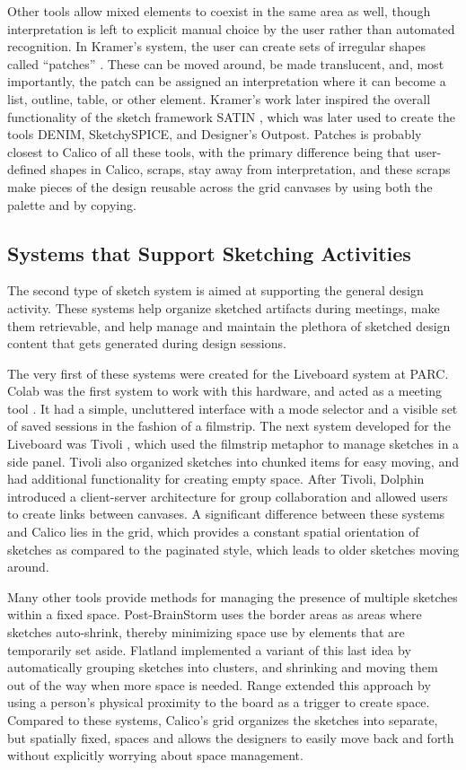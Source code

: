 Other tools allow mixed elements to coexist in the same area as well, though interpretation is left to explicit manual choice by the user rather than automated recognition. In Kramer's system, the user can create sets of irregular shapes called ``patches'' \citep{Kramer}. These can be moved around, be made translucent, and, most importantly, the patch can be assigned an interpretation where it can become a list, outline, table, or other element. Kramer's work later inspired the overall functionality of the sketch framework SATIN \citep{Hong}, which was later used to create the tools DENIM, SketchySPICE, and Designer's Outpost.  Patches is probably closest to Calico of all these tools, with the primary difference being that user-defined shapes in Calico, scraps, stay away from interpretation, and these scraps make pieces of the design reusable across the grid canvases by using both the palette and by copying.

\subsection {Systems that Support Sketching Activities}
\label{relatedwork:2}

The second type of sketch system is aimed at supporting the general design activity. These systems help organize sketched artifacts during meetings, make them retrievable, and help manage and maintain the plethora of sketched design content that gets generated during design sessions. 

The very first of these systems were created for the Liveboard system at PARC. Colab was the first system to work with this hardware, and acted as a meeting tool \citep{Stefik}. It had a simple, uncluttered interface with a mode selector and a visible set of saved sessions in the fashion of a filmstrip. The next system developed for the Liveboard was Tivoli \citep{Pederson}, which used the filmstrip metaphor to manage sketches in a side panel. Tivoli also organized sketches into chunked items for easy moving, and had additional functionality for creating empty space. After Tivoli, Dolphin \citep{Streitz} introduced a client-server architecture for group collaboration and allowed users to create links between canvases. A significant difference between these systems and Calico lies in the grid, which provides a constant spatial orientation of sketches as compared to the paginated style, which leads to older sketches moving around. 

Many other tools provide methods for managing the presence of multiple sketches within a fixed space. Post-BrainStorm \citep{Guimbretiere} uses the border areas as areas where sketches auto-shrink, thereby minimizing space use by elements that are temporarily set aside. Flatland \citep{Mynatt} implemented a variant of this last idea by automatically grouping sketches into clusters, and shrinking and moving them out of the way when more space is needed. Range \citep{Ju} extended this approach by using a person's physical proximity to the board as a trigger to create space. Compared to these systems, Calico's grid organizes the sketches into separate, but spatially fixed, spaces and allows the designers to easily move back and forth without explicitly worrying about space management.

